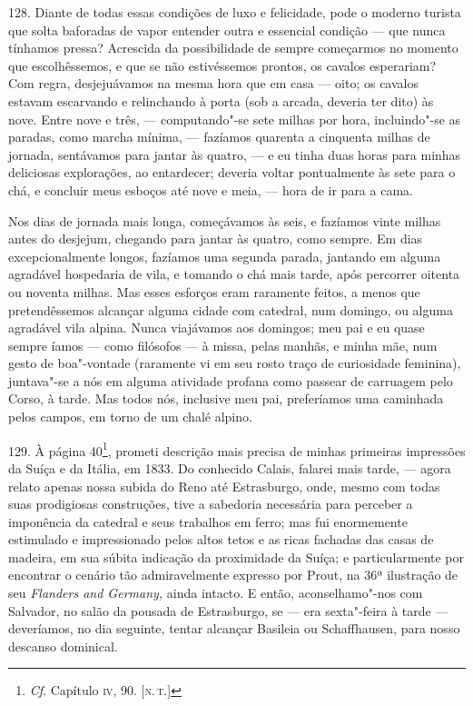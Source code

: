 128. Diante de todas essas condições de luxo e felicidade, pode o
moderno turista que solta baforadas de vapor entender outra e essencial
condição --- que nunca tínhamos pressa? Acrescida da possibilidade de
sempre começarmos no momento que escolhêssemos, e que se não
estivéssemos prontos, os cavalos esperariam? Com regra, desjejuávamos na
mesma hora que em casa --- oito; os cavalos estavam escarvando e
relinchando à porta (sob a arcada, deveria ter dito) às nove. Entre nove
e três, --- computando"-se sete milhas por hora, incluindo"-se as paradas,
como marcha mínima, --- fazíamos quarenta a cinquenta milhas de jornada,
sentávamos para jantar às quatro, --- e eu tinha duas horas para minhas
deliciosas explorações, ao entardecer; deveria voltar pontualmente às
sete para o chá, e concluir meus esboços até nove e meia, --- hora de ir
para a cama.

Nos dias de jornada mais longa, começávamos às seis, e fazíamos vinte
milhas antes do desjejum, chegando para jantar às quatro, como sempre.
Em dias excepcionalmente longos, fazíamos uma segunda parada, jantando
em alguma agradável hospedaria de vila, e tomando o chá mais tarde, após
percorrer oitenta ou noventa milhas. Mas esses esforços eram raramente
feitos, a menos que pretendêssemos alcançar alguma cidade com catedral,
num domingo, ou alguma agradável vila alpina. Nunca viajávamos aos
domingos; meu pai e eu quase sempre íamos --- como filósofos --- à missa,
pelas manhãs, e minha mãe, num gesto de boa"-vontade (raramente vi em seu
rosto traço de curiosidade feminina), juntava"-se a nós em alguma
atividade profana como passear de carruagem pelo Corso, à tarde. Mas
todos nós, inclusive meu pai, preferíamos uma caminhada pelos campos, em
torno de um chalé alpino.

129. À página 40\footnote{\emph{Cf}. Capítulo \textsc{iv}, 90. {[}\textsc{n.\,t.}{]}},
prometi descrição mais precisa de minhas primeiras impressões da Suíça e
da Itália, em 1833. Do conhecido Calais, falarei mais tarde, --- agora
relato apenas nossa subida do Reno até Estrasburgo, onde, mesmo com
todas suas prodigiosas construções, tive a sabedoria necessária para
perceber a imponência da catedral e seus trabalhos em ferro; mas fui
enormemente estimulado e impressionado pelos altos tetos e as ricas
fachadas das casas de madeira, em sua súbita indicação da proximidade da
Suíça; e particularmente por encontrar o cenário tão admiravelmente
expresso por Prout, na 36ª ilustração de seu \emph{Flanders and
Germany,} ainda intacto. E então, aconselhamo"-nos com Salvador, no salão
da pousada de Estrasburgo, se --- era sexta"-feira à tarde --- deveríamos,
no dia seguinte, tentar alcançar Basileia ou Schaffhausen, para nosso
descanso dominical.

